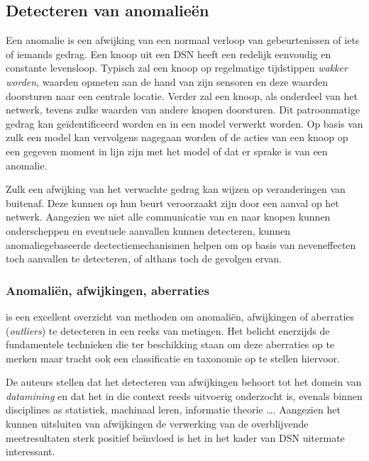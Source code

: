 
\subsection{Detecteren van anomalie\"en}
\label{subsection:anomaly}

Een anomalie is een afwijking van een normaal verloop van gebeurtenissen of
iets of iemands gedrag. Een knoop uit een DSN heeft een redelijk eenvoudig en
constante levensloop. Typisch zal een knoop op regelmatige tijdstippen
\emph{wakker worden}, waarden opmeten aan de hand van zijn sensoren en deze
waarden doorsturen naar een centrale locatie. Verder zal een knoop, als
onderdeel van het netwerk, tevens zulke waarden van andere knopen doorsturen.
Dit patroonmatige gedrag kan ge\"identificeerd worden en in een model verwerkt
worden. Op basis van zulk een model kan vervolgens nagegaan worden of de acties
van een knoop op een gegeven moment in lijn zijn met het model of dat er sprake
is van een anomalie.

Zulk een afwijking van het verwachte gedrag kan wijzen op veranderingen van
buitenaf. Deze kunnen op hun beurt veroorzaakt zijn door een aanval op het
netwerk. Aangezien we niet alle communicatie van en naar knopen kunnen
onderscheppen en eventuele aanvallen kunnen detecteren, kunnen
anomaliegebaseerde dectectiemechanismen helpen om op basis van neveneffecten
toch aanvallen te detecteren, of althans toch de gevolgen ervan.

\subsubsection*{Anomali\"en, afwijkingen, aberraties}
\label{subsubsection:outlier}

\citep{zhang2010outlier} is een excellent overzicht van methoden om anomali\"en,
afwijkingen of aberraties (\emph{outliers}) te detecteren in een reeks
van metingen. Het belicht enerzijds de fundamentele technieken die ter
beschikking staan om deze aberraties op te merken maar tracht ook een
classificatie en taxonomie op te stellen hiervoor.

De auteurs stellen dat het detecteren van afwijkingen behoort tot het domein
van \emph{datamining} en dat het in die context reeds uitvoerig onderzocht is,
evenals binnen disciplines as statistiek, machinaal leren, informatie
theorie \dots. Aangezien het kunnen uitsluiten van afwijkingen de verwerking
van de overblijvende meetresultaten sterk positief be\"invloed is het in het
kader van DSN uitermate interessant.

